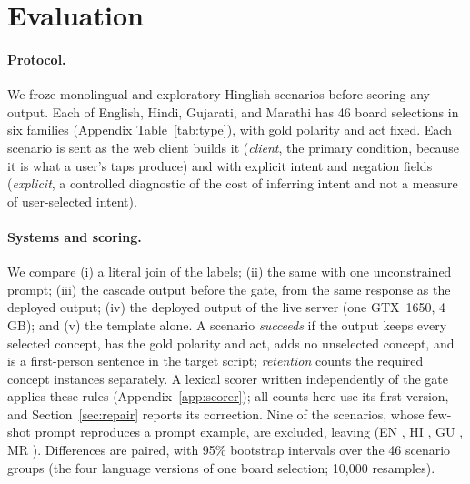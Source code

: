 \section{Evaluation}
\label{sec:eval}

\paragraph{Protocol.}
We froze \NScen{} monolingual and \NScenCM{} exploratory Hinglish scenarios before scoring any output.
Each of English, Hindi, Gujarati, and Marathi has 46 board selections in six families (Appendix Table~\ref{tab:type}), with gold polarity and act fixed.
Each scenario is sent as the web client builds it (\emph{client}, the primary condition, because it is what a user's taps produce) and with explicit intent and negation fields (\emph{explicit}, a controlled diagnostic of the cost of inferring intent and not a measure of user-selected intent).

\paragraph{Systems and scoring.}
We compare (i) a literal join of the labels; (ii) the same \qwen{} with one unconstrained prompt; (iii) the cascade output before the gate, from the same response as the deployed output; (iv) the deployed output of the live server (one GTX~1650, 4\,GB); and (v) the template alone.
A scenario \emph{succeeds} if the output keeps every selected concept, has the gold polarity and act, adds no unselected concept, and is a first-person sentence in the target script; \emph{retention} counts the \NConc{} required concept instances separately.
A lexical scorer written independently of the gate applies these rules (Appendix~\ref{app:scorer}); all counts here use its first version, and Section~\ref{sec:repair} reports its correction.
Nine of the \NScen{} scenarios, whose few-shot prompt reproduces a prompt example, are excluded, leaving \NPrimAll{} (EN \NPrimEN{}, HI \NPrimHI{}, GU \NPrimGU{}, MR \NPrimMR{}).
Differences are paired, with 95\% bootstrap intervals over the 46 scenario groups (the four language versions of one board selection; 10,000 resamples).




